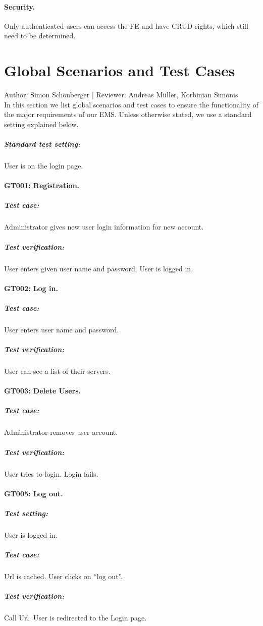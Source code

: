 \documentclass{scrreprt}
\begin{document}
\paragraph{Security.}
Only authenticated users can access the FE and have CRUD rights, which still need to be determined.

\section{Global Scenarios and Test Cases} 
Author:  Simon Sch\"onberger |
Reviewer: Andreas M\"uller, Korbinian Simonis \\

\noindent In this section we list global scenarios and test cases to ensure the functionality of the major requirements of our EMS. Unless otherwise stated, we use a standard setting explained below.
\\
\subparagraph{Standard test setting:} User is on the login page.\newline

\paragraph{GT001: Registration.} 
\subparagraph{Test case:} Administrator gives new user login information for new account.
\subparagraph{Test verification:} User enters given user name and password. User is logged in. 

\paragraph{GT002: Log in.} 
\subparagraph{Test case:} User enters user name and password.
\subparagraph{Test verification:} User can see a list of their servers.

\paragraph{GT003: Delete Users.} 
\subparagraph{Test case:} Administrator removes user account.
\subparagraph{Test verification:} User tries to login. Login fails.

\paragraph{GT005: Log out.} 
\subparagraph{Test setting:} User is logged in.
\subparagraph{Test case:} Url is cached. User clicks on “log out”.
\subparagraph{Test verification:} Call Url. User is redirected to the Login page.
\end{document}
